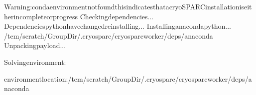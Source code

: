 \documentclass[a4paper,10pt,english]{sphinxmanual}
\begin{document}
\begin{sphinxVerbatim}[commandchars=\\\{\}]
Warning:condaenvironmentnotfoundthisindicatesthatacryoSPARCinstallationiseitherincompleteorprogress
Checkingdependencies...
Dependenciespythonhavechanged\PYGZhy{}reinstalling...
\PYGZhy{}\PYGZhy{}\PYGZhy{}\PYGZhy{}\PYGZhy{}\PYGZhy{}\PYGZhy{}\PYGZhy{}\PYGZhy{}\PYGZhy{}\PYGZhy{}\PYGZhy{}\PYGZhy{}\PYGZhy{}\PYGZhy{}\PYGZhy{}\PYGZhy{}\PYGZhy{}\PYGZhy{}\PYGZhy{}\PYGZhy{}\PYGZhy{}\PYGZhy{}\PYGZhy{}\PYGZhy{}\PYGZhy{}\PYGZhy{}\PYGZhy{}\PYGZhy{}\PYGZhy{}\PYGZhy{}\PYGZhy{}\PYGZhy{}\PYGZhy{}\PYGZhy{}\PYGZhy{}\PYGZhy{}\PYGZhy{}\PYGZhy{}\PYGZhy{}\PYGZhy{}\PYGZhy{}\PYGZhy{}\PYGZhy{}\PYGZhy{}\PYGZhy{}\PYGZhy{}\PYGZhy{}\PYGZhy{}\PYGZhy{}\PYGZhy{}\PYGZhy{}\PYGZhy{}\PYGZhy{}\PYGZhy{}\PYGZhy{}\PYGZhy{}\PYGZhy{}\PYGZhy{}\PYGZhy{}\PYGZhy{}\PYGZhy{}\PYGZhy{}\PYGZhy{}\PYGZhy{}\PYGZhy{}\PYGZhy{}\PYGZhy{}\PYGZhy{}\PYGZhy{}\PYGZhy{}\PYGZhy{}
Installinganacondapython...
\PYGZhy{}\PYGZhy{}\PYGZhy{}\PYGZhy{}\PYGZhy{}\PYGZhy{}\PYGZhy{}\PYGZhy{}\PYGZhy{}\PYGZhy{}\PYGZhy{}\PYGZhy{}\PYGZhy{}\PYGZhy{}\PYGZhy{}\PYGZhy{}\PYGZhy{}\PYGZhy{}\PYGZhy{}\PYGZhy{}\PYGZhy{}\PYGZhy{}\PYGZhy{}\PYGZhy{}\PYGZhy{}\PYGZhy{}\PYGZhy{}\PYGZhy{}\PYGZhy{}\PYGZhy{}\PYGZhy{}\PYGZhy{}\PYGZhy{}\PYGZhy{}\PYGZhy{}\PYGZhy{}\PYGZhy{}\PYGZhy{}\PYGZhy{}\PYGZhy{}\PYGZhy{}\PYGZhy{}\PYGZhy{}\PYGZhy{}\PYGZhy{}\PYGZhy{}\PYGZhy{}\PYGZhy{}\PYGZhy{}\PYGZhy{}\PYGZhy{}\PYGZhy{}\PYGZhy{}\PYGZhy{}\PYGZhy{}\PYGZhy{}\PYGZhy{}\PYGZhy{}\PYGZhy{}\PYGZhy{}\PYGZhy{}\PYGZhy{}\PYGZhy{}\PYGZhy{}\PYGZhy{}\PYGZhy{}\PYGZhy{}\PYGZhy{}\PYGZhy{}\PYGZhy{}\PYGZhy{}\PYGZhy{}
/tem/scratch/\PYGZlt{}GroupDir\PYGZgt{}/.cryosparc/cryosparc\PYGZus{}worker/deps/anaconda
Unpackingpayload...

Solvingenvironment:


environmentlocation:/tem/scratch/\PYGZlt{}GroupDir\PYGZgt{}/.cryosparc/cryosparc\PYGZus{}worker/deps/anaconda


\end{sphinxVerbatim}
\end{document}
